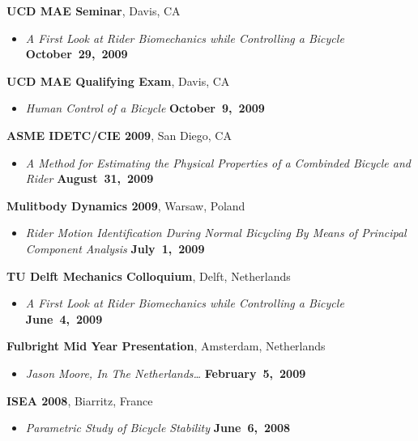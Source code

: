 \documentclass[10pt]{article}
\newenvironment{outerlist}[1][\enskip\textbullet]%
        {\begin{itemize}[#1]}{\end{itemize}%
         \vspace{-.6\baselineskip}}
\newcommand{\blankline}{\quad\pagebreak[2]}
\begin{document}
\blankline

\textbf{UCD MAE Seminar}, Davis, CA
\begin{outerlist}
  \item[] \textit{A First Look at Rider Biomechanics while Controlling a Bicycle}
    \hfill \textbf{October~29,~2009}
\end{outerlist}

\blankline

\textbf{UCD MAE Qualifying Exam}, Davis, CA
\begin{outerlist}
  \item[] \textit{Human Control of a Bicycle}
    \hfill \textbf{October~9,~2009}
\end{outerlist}

\blankline

\textbf{ASME IDETC/CIE 2009}, San Diego, CA
\begin{outerlist}
  \item[] \textit{A Method for Estimating the Physical Properties of a Combinded Bicycle and
Rider}
    \hfill \textbf{August~31,~2009}
\end{outerlist}

\blankline

\textbf{Mulitbody Dynamics 2009}, Warsaw, Poland
\begin{outerlist}
  \item[] \textit{Rider Motion Identification During Normal Bicycling By Means of Principal
Component Analysis}
    \hfill \textbf{July~1,~2009}
\end{outerlist}

\blankline

\textbf{TU Delft Mechanics Colloquium}, Delft, Netherlands
\begin{outerlist}
  \item[] \textit{A First Look at Rider Biomechanics while Controlling a Bicycle}
    \hfill \textbf{June~4,~2009}
\end{outerlist}

\blankline

\textbf{Fulbright Mid Year Presentation}, Amsterdam, Netherlands
\begin{outerlist}
  \item[] \textit{Jason Moore, In The Netherlands\ldots}
    \hfill \textbf{February~5,~2009}
\end{outerlist}

\blankline

\textbf{ISEA 2008}, Biarritz, France
\begin{outerlist}
  \item[] \textit{Parametric Study of Bicycle Stability}
    \hfill \textbf{June~6,~2008}
\end{outerlist}
\end{document}
